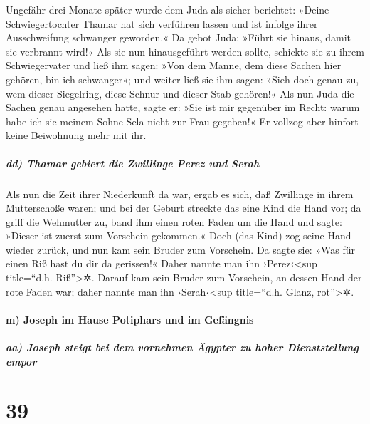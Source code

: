  Ungefähr drei Monate später wurde dem Juda als sicher
berichtet: »Deine Schwiegertochter Thamar hat sich verführen lassen und
ist infolge ihrer Ausschweifung schwanger geworden.« Da gebot Juda:
»Führt sie hinaus, damit sie verbrannt wird!«  Als sie
nun hinausgeführt werden sollte, schickte sie zu ihrem Schwiegervater
und ließ ihm sagen: »Von dem Manne, dem diese Sachen hier gehören, bin
ich schwanger«; und weiter ließ sie ihm sagen: »Sieh doch genau zu, wem
dieser Siegelring, diese Schnur und dieser Stab gehören!«
 Als nun Juda die Sachen genau angesehen hatte, sagte er:
»Sie ist mir gegenüber im Recht: warum habe ich sie meinem Sohne Sela
nicht zur Frau gegeben!« Er vollzog aber hinfort keine Beiwohnung mehr
mit ihr.

\hypertarget{dd-thamar-gebiert-die-zwillinge-perez-und-serah}{%
\subparagraph{dd) Thamar gebiert die Zwillinge Perez und
Serah}\label{dd-thamar-gebiert-die-zwillinge-perez-und-serah}}

 Als nun die Zeit ihrer Niederkunft da war, ergab es
sich, daß Zwillinge in ihrem Mutterschoße waren;  und bei
der Geburt streckte das eine Kind die Hand vor; da griff die Wehmutter
zu, band ihm einen roten Faden um die Hand und sagte: »Dieser ist zuerst
zum Vorschein gekommen.«  Doch (das Kind) zog seine Hand
wieder zurück, und nun kam sein Bruder zum Vorschein. Da sagte sie: »Was
für einen Riß hast du dir da gerissen!« Daher nannte man ihn
›Perez‹\textless sup title=``d.h. Riß''\textgreater✲. 
Darauf kam sein Bruder zum Vorschein, an dessen Hand der rote Faden war;
daher nannte man ihn ›Serah‹\textless sup title=``d.h. Glanz,
rot''\textgreater✲.

\hypertarget{m-joseph-im-hause-potiphars-und-im-gefuxe4ngnis}{%
\paragraph{m) Joseph im Hause Potiphars und im
Gefängnis}\label{m-joseph-im-hause-potiphars-und-im-gefuxe4ngnis}}

\hypertarget{aa-joseph-steigt-bei-dem-vornehmen-uxe4gypter-zu-hoher-dienststellung-empor}{%
\subparagraph{aa) Joseph steigt bei dem vornehmen Ägypter zu hoher
Dienststellung
empor}\label{aa-joseph-steigt-bei-dem-vornehmen-uxe4gypter-zu-hoher-dienststellung-empor}}

\hypertarget{section-38}{%
\section{39}\label{section-38}}

